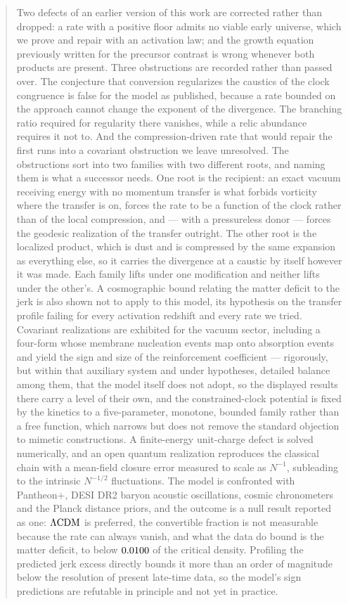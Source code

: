 \begin{abstract}
Two defects of an earlier version of this work are corrected rather than
dropped: a rate with a positive floor admits no viable early universe, which we
prove and repair with an activation law; and the growth equation previously
written for the precursor contrast is wrong whenever both products are present.
Three obstructions are recorded rather than passed over. The conjecture that
conversion regularizes the caustics of the clock congruence is false for the
model as published, because a rate bounded on the approach cannot change the
exponent of the divergence. The branching ratio required for regularity there
vanishes, while a relic abundance requires it not to. And the
compression-driven rate that would repair the first runs into a covariant
obstruction we leave unresolved. The obstructions sort into two families
with two different roots, and naming them is what a successor needs. One root
is the recipient: an exact vacuum receiving energy with no momentum transfer
is what forbids vorticity where the transfer is on, forces the rate to be a
function of the clock rather than of the local compression, and --- with a
pressureless donor --- forces the geodesic realization of the transfer
outright. The other root is the localized product, which is dust and is
compressed by the same expansion as everything else, so it carries the
divergence at a caustic by itself however it was made. Each family lifts under
one modification and neither lifts under the other's. A cosmographic bound relating the matter
deficit to the jerk is also shown not to apply to this model, its hypothesis on
the transfer profile failing for every activation redshift and every rate we
tried.
Covariant realizations are exhibited for the vacuum sector, including a
four-form whose membrane nucleation events map onto absorption events and
yield the sign and size of the reinforcement coefficient --- rigorously, but
within that auxiliary system and under hypotheses, detailed balance among
them, that the model itself does not adopt, so the displayed results there
carry a level of their own, and the
constrained-clock potential is fixed by the kinetics to a five-parameter,
monotone, bounded family rather than a free function, which narrows but does
not remove the standard objection to mimetic constructions. A
finite-energy unit-charge defect is solved numerically, and an open quantum
realization reproduces the classical chain with a mean-field closure error
measured to scale as $N^{-1}$, subleading to the intrinsic $N^{-1/2}$
fluctuations. The model is confronted with Pantheon+, DESI DR2 baryon acoustic
oscillations, cosmic chronometers and the Planck distance priors, and the
outcome is a null result reported as one: $\LCDM$ is preferred, the convertible
fraction is not measurable because the rate can always vanish, and what the
data do bound is the matter deficit, to below
$\numProfileXiHBaselineMatterDeficitLimitNV$ of the critical density.
Profiling the predicted jerk excess directly bounds it more than an order of
magnitude below the resolution of present late-time data, so the model's sign
predictions are refutable in principle and not yet in practice.


\end{abstract}
